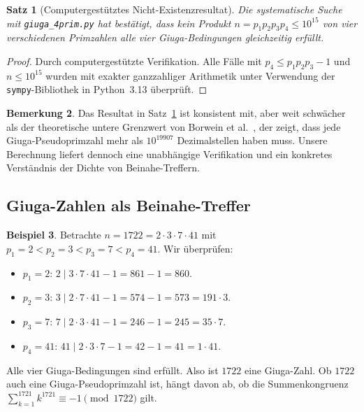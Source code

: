 \documentclass[12pt,a4paper]{amsart}
\newtheorem{theorem}{Satz}[section]
\theoremstyle{definition}
\newtheorem{example}[theorem]{Beispiel}
\newtheorem{remark}[theorem]{Bemerkung}
\begin{document}
\begin{theorem}[Computergestütztes Nicht-Existenzresultat]
\label{satz:rechner}
Die systematische Suche mit \texttt{giuga\_4prim.py} hat bestätigt, dass
kein Produkt $n = p_1 p_2 p_3 p_4 \le 10^{15}$ von vier verschiedenen
Primzahlen alle vier Giuga-Bedingungen gleichzeitig erfüllt.
\end{theorem}

\begin{proof}
Durch computergestützte Verifikation.  Alle Fälle mit $p_4 \le p_1 p_2 p_3 - 1$
und $n \le 10^{15}$ wurden mit exakter ganzzahliger Arithmetik unter Verwendung
der \texttt{sympy}-Bibliothek in Python~3.13 überprüft.
\end{proof}

\begin{remark}
Das Resultat in Satz~\ref{satz:rechner} ist konsistent mit, aber weit schwächer
als der theoretische untere Grenzwert von Borwein et al.\ \cite{Borwein1996},
der zeigt, dass jede Giuga-Pseudoprimzahl mehr als $10^{19907}$ Dezimalstellen
haben muss.  Unsere Berechnung liefert dennoch eine unabhängige Verifikation
und ein konkretes Verständnis der Dichte von Beinahe-Treffern.
\end{remark}

\subsection{Giuga-Zahlen als Beinahe-Treffer}

\begin{example}
\label{bsp:1722}
Betrachte $n = 1722 = 2 \cdot 3 \cdot 7 \cdot 41$ mit
$p_1 = 2 < p_2 = 3 < p_3 = 7 < p_4 = 41$.  Wir überprüfen:
\begin{itemize}
  \item $p_1 = 2$: $2 \mid 3 \cdot 7 \cdot 41 - 1 = 861 - 1 = 860$. \checkmark
  \item $p_2 = 3$: $3 \mid 2 \cdot 7 \cdot 41 - 1 = 574 - 1 = 573 = 191 \cdot 3$. \checkmark
  \item $p_3 = 7$: $7 \mid 2 \cdot 3 \cdot 41 - 1 = 246 - 1 = 245 = 35 \cdot 7$. \checkmark
  \item $p_4 = 41$: $41 \mid 2 \cdot 3 \cdot 7 - 1 = 42 - 1 = 41 = 1 \cdot 41$. \checkmark
\end{itemize}
Alle vier Giuga-Bedingungen sind erfüllt.  Also ist $1722$ eine Giuga-Zahl.
Ob $1722$ auch eine Giuga-Pseudoprimzahl ist, hängt davon ab, ob die
Summenkongruenz $\sum_{k=1}^{1721} k^{1721} \equiv -1 \pmod{1722}$ gilt.
\end{example}
\end{document}
